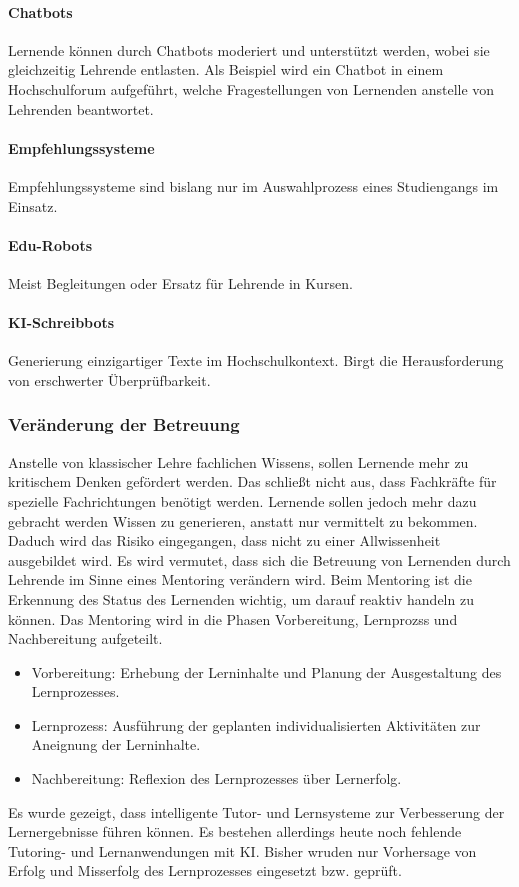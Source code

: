 \paragraph*{Chatbots}
Lernende können durch Chatbots moderiert und unterstützt werden, wobei sie gleichzeitig Lehrende entlasten. Als Beispiel wird ein Chatbot in einem Hochschulforum aufgeführt, welche Fragestellungen von Lernenden anstelle von Lehrenden beantwortet.

\paragraph*{Empfehlungssysteme}
Empfehlungssysteme sind bislang nur im Auswahlprozess eines Studiengangs im Einsatz.

\paragraph*{Edu-Robots}
Meist Begleitungen oder Ersatz für Lehrende in Kursen.

\paragraph*{KI-Schreibbots}
Generierung einzigartiger Texte im Hochschulkontext. Birgt die Herausforderung von erschwerter Überprüfbarkeit.

\subsubsection*{Veränderung der Betreuung}
Anstelle von klassischer Lehre fachlichen Wissens, sollen Lernende mehr zu kritischem Denken gefördert werden. Das schließt nicht aus, dass Fachkräfte für spezielle Fachrichtungen benötigt werden. Lernende sollen jedoch mehr dazu gebracht werden Wissen zu generieren, anstatt nur vermittelt zu bekommen. Daduch wird das Risiko eingegangen, dass nicht zu einer \glqq Allwissenheit\grqq{} ausgebildet wird. Es wird vermutet, dass sich die Betreuung von Lernenden durch Lehrende im Sinne eines Mentoring verändern wird. Beim Mentoring ist die Erkennung des Status des Lernenden wichtig, um darauf reaktiv handeln zu können. Das Mentoring wird in die Phasen Vorbereitung, Lernprozss und Nachbereitung aufgeteilt.
\begin{itemize}
    \item Vorbereitung: Erhebung der Lerninhalte und Planung der Ausgestaltung des Lernprozesses.
    \item Lernprozess: Ausführung der geplanten individualisierten Aktivitäten zur Aneignung der Lerninhalte.
    \item Nachbereitung: Reflexion des Lernprozesses über Lernerfolg.
\end{itemize}
Es wurde gezeigt, dass intelligente Tutor- und Lernsysteme zur Verbesserung der Lernergebnisse führen können. Es bestehen allerdings heute noch fehlende Tutoring- und Lernanwendungen mit KI. Bisher wruden nur Vorhersage von Erfolg und Misserfolg des Lernprozesses eingesetzt bzw. geprüft.


